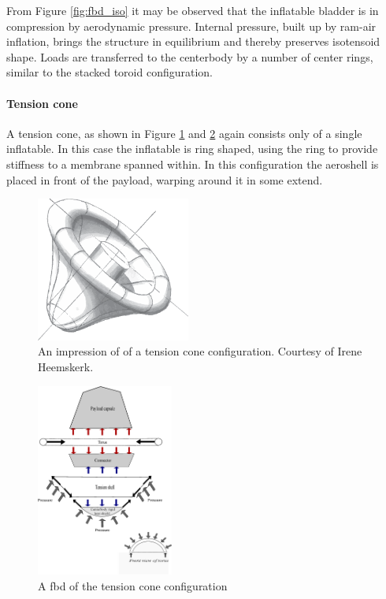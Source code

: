 From Figure  \ref{fig:fbd_iso} it may be observed that the inflatable bladder is in compression by aerodynamic pressure. Internal pressure, built up by ram-air inflation, brings the structure in equilibrium and thereby preserves isotensoid shape. Loads are transferred to the centerbody by a number of center rings, similar to the stacked toroid configuration.

\paragraph{Tension cone}

A tension cone, as shown in Figure  \ref{fig:conc_tension} and \ref{fig:fbd_tension} again consists only of a single inflatable. In this case the inflatable is ring shaped, using the ring to provide stiffness to a membrane spanned within. In this configuration the aeroshell is placed in front of the payload, warping around it in some extend.

\begin{figure}[H]
\centering
\includegraphics[width = 0.45\textwidth]{Figure/tension_cone.eps}

\caption{An impression of of a tension cone configuration. Courtesy of Irene Heemskerk.}

\label{fig:conc_tension}
\end{figure}

\begin{figure}[H]
\centering
\includegraphics[width = 0.4\textwidth]{Figure/FBD_tensioncone.eps}
\caption{A \gls{fbd} of the tension cone configuration}
\label{fig:fbd_tension}
\end{figure}


